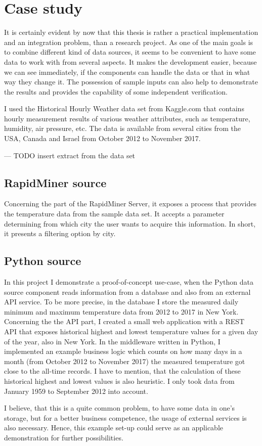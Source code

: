 \chapter{Case study} \label{case-study}

It is certainly evident by now that this thesis is rather a practical implementation and an integration problem, than a research project. As one of the main goals is to combine different kind of data sources, it seems to be convenient to have some data to work with from several aspects. It makes the development easier, because we can see immediately, if the components can handle the data or that in what way they change it. The possession of sample inputs can also help to demonstrate the results and provides the capability of some independent verification.

I used the Historical Hourly Weather data set from Kaggle.com that contains hourly measurement results of various weather attributes, such as temperature, humidity, air pressure, etc. The data is available from several cities from the USA, Canada and Israel from October 2012 to November 2017.

\begin{center}
	--- TODO insert extract from the data set
\end{center}

\section{RapidMiner source}

Concerning the part of the RapidMiner Server, it exposes a process that provides the temperature data from the sample data set. It accepts a parameter determining from which city the user wants to acquire this information. In short, it presents a filtering option by city.

\section{Python source} \label{case-study-python-source}

In this project I demonstrate a proof-of-concept use-case, when the Python data source component reads information from a database and also from an external API service. To be more precise, in the database I store the measured daily minimum and maximum temperature data from 2012 to 2017 in New York. Concerning the the API part, I created a small web application with a REST API that exposes historical highest and lowest temperature values for a given day of the year, also in New York. In the middleware written in Python, I implemented an example business logic which counts on how many days in a month (from October 2012 to November 2017) the measured temperature got close to the all-time records. I have to mention, that the calculation of these historical highest and lowest values is also heuristic. I only took data from January 1959 to September 2012 into account.

I believe, that this is a quite common problem, to have some data in one's storage, but for a better business competence, the usage of external services is also necessary. Hence, this example set-up could serve as an applicable demonstration for further possibilities.